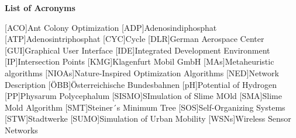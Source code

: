 \newpage
\vspace*{2.2 cm}
\Large
\noindent
{\bf List of Acronyms} \\
\vspace*{0.7 cm}
\normalsize

\begin{acronym}
[ACO]{Ant Colony Optimization}
[ADP]{Adenosindiphosphat}
[ATP]{Adenosintriphosphat}
[CYC]{Cycle}
[DLR]{German Aerospace Center}
[GUI]{Graphical User Interface}
[IDE]{Integrated Development Environment}
[IP]{Intersection Points}
[KMG]{Klagenfurt Mobil GmbH}
[MAs]{Metaheuristic algorithms}
[NIOAs]{Nature-Inspired Optimization Algorithms}
[NED]{Network Description}
[ÖBB]{Österreichische Bundesbahnen}
[pH]{Potential of Hydrogen}
[PP]{Physarum Polycephalum}
[SISMO]{SImulation of Slime MOld}
[SMA]{Slime Mold Algorithm}
[SMT]{Steiner´s Minimum Tree}
[SOS]{Self-Organizing Systems}
[STW]{Stadtwerke}
[SUMO]{Simulation of Urban Mobility}
[WSNs]{Wireless Sensor Networks}
\end{acronym}

\afterpage{\blankpage} 
